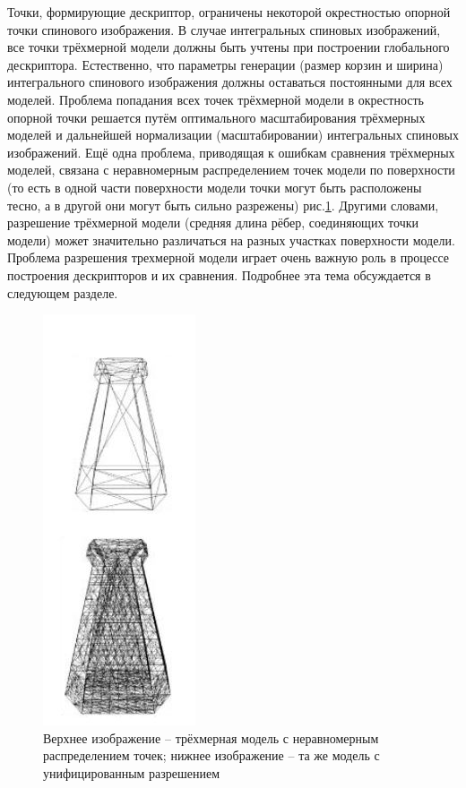 \documentclass[14pt]{article}
\numberwithin{figure}{section}
\numberwithin{equation}{section}
\begin{document}
Точки, формирующие дескриптор, ограничены некоторой окрестностью опорной точки спинового изображения. В случае интегральных спиновых изображений, все точки трёхмерной модели должны быть учтены при построении глобального дескриптора. Естественно, что параметры генерации (размер корзин и ширина) интегрального спинового изображения должны оставаться постоянными для всех моделей.
Проблема попадания всех точек трёхмерной модели в окрестность опорной точки решается путём оптимального масштабирования трёхмерных моделей и дальнейшей нормализации (масштабировании) интегральных спиновых изображений. Ещё одна проблема, приводящая к ошибкам сравнения трёхмерных моделей, связана с неравномерным распределением точек модели по поверхности (то есть в одной части поверхности модели точки могут быть расположены тесно, а в другой они могут быть сильно разрежены) рис.\ref{ris:4}. Другими словами, разрешение трёхмерной модели (средняя длина рёбер, соединяющих точки модели) может значительно различаться на разных участках поверхности модели. Проблема разрешения трехмерной модели играет очень важную роль в процессе построения дескрипторов и их сравнения. Подробнее эта тема обсуждается в следующем разделе.

\begin{figure}[h]
	\begin{center}
		\includegraphics[scale=0.9]{4.JPG}
		\caption{Верхнее изображение – трёхмерная модель с неравномерным распределением точек; нижнее изображение – та же модель с унифицированным разрешением}
		\label{ris:4}
	\end{center}
\end{figure}
\end{document}
